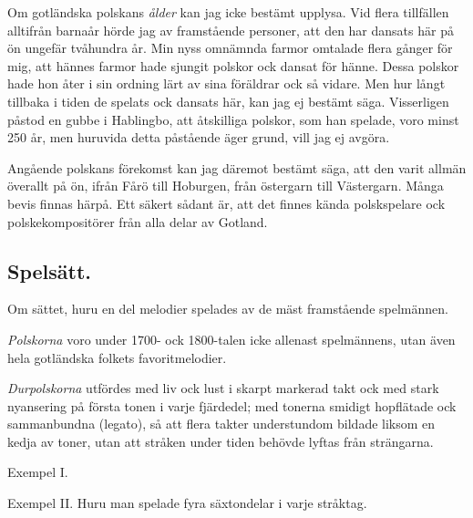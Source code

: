 {Om gotländska polskans \textit{ålder} kan jag icke bestämt upplysa. Vid flera tillfällen alltifrån barnaår hörde jag av framstående personer, att den har dansats här på ön ungefär tvåhundra år. Min nyss omnämnda farmor omtalade flera gånger för mig, att hännes farmor hade sjungit polskor ock dansat för hänne. Dessa polskor hade hon åter i sin ordning lärt av sina föräldrar ock så vidare. Men hur långt tillbaka i tiden
de spelats ock dansats här, kan jag ej bestämt säga. Visserligen påstod en gubbe i Hablingbo, att åtskilliga polskor, som han spelade, voro minst 250 år, men huruvida detta påstående äger grund, vill jag ej avgöra.

Angående polskans förekomst kan jag däremot bestämt säga, att den varit allmän överallt på ön, ifrån Fårö till Hoburgen, från östergarn till Västergarn. Många bevis finnas härpå. Ett säkert sådant är, att det finnes kända polskspelare ock polskekompositörer från alla delar av Gotland.


\setlength{\parindent}{0mm}
\newpage

\subsection*{\centering Spelsätt.}
\vspace{5mm}

Om sättet, huru en del melodier spelades av de mäst framstående spelmännen.

\vspace{5mm}

\textit{Polskorna} voro under 1700- ock 1800-talen icke allenast spelmännens, utan även hela gotländska folkets favoritmelodier.

\vspace{5mm}

\textit{Durpolskorna} utfördes med liv ock lust i skarpt markerad takt ock med stark nyansering på första tonen i varje fjärdedel; med tonerna smidigt hopflätade ock sammanbundna (legato), så att flera takter understundom bildade liksom en kedja av toner, utan att stråken under tiden behövde lyftas från strängarna.

\vspace{5mm}

Exempel I.


\vspace{5mm}

Exempel II. Huru man spelade fyra säxtondelar i varje \guillemotright{}stråktag\guillemotright{}.

}
